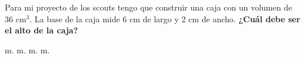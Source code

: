 Para mi proyecto de los scouts tengo que construir una caja con un volumen de 36 cm$^3$.
La base de la caja mide 6 cm de largo y 2 cm de ancho.
\textbf{¿Cuál debe ser el alto de la caja?}

\begin{oneparchoices}
     m.
     m.
     m.
     m.
\end{oneparchoices}